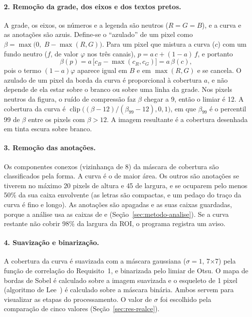 \paragraph{2. Remoção da grade, dos eixos e dos textos pretos.}
A grade, os eixos, os números e a legenda são neutros ($R=G=B$), e a curva e as anotações são azuis. Define-se o ``azulado'' de um pixel como $\beta=\max\bigl(0,\;B-\max(R,G)\bigr)$. Para um pixel que mistura a curva ($c$) com um fundo neutro ($f$, de valor $\varphi$ nos três canais), $p=a\,c+(1-a)\,f$, e portanto
\begin{equation}
\beta(p)=a\,\bigl[c_B-\max(c_R,c_G)\bigr]=a\,\beta(c),
\end{equation}
pois o termo $(1-a)\varphi$ aparece igual em $B$ e em $\max(R,G)$ e se cancela. O azulado de um pixel da borda da curva é proporcional à cobertura $a$, e não depende de ela estar sobre o branco ou sobre uma linha da grade. Nos pixels neutros da figura, o ruído de compressão faz $\beta$ chegar a 9, então o limiar é 12. A cobertura da curva é $\operatorname{clip}\bigl((\beta-12)/(\beta_{99}-12),0,1\bigr)$, em que $\beta_{99}$ é o percentil 99 de $\beta$ entre os pixels com $\beta>12$. A imagem resultante é a cobertura desenhada em tinta escura sobre branco.

\paragraph{3. Remoção das anotações.}
Os componentes conexos (vizinhança de 8) da máscara de cobertura são classificados pela forma. A curva é o de maior área. Os outros são anotações se tiverem no máximo 20 pixels de altura e 45 de largura, e se ocuparem pelo menos 50\% da sua caixa envolvente (as letras são compactas, e um pedaço do traço da curva é fino e longo). As anotações são apagadas e as suas caixas guardadas, porque a análise usa as caixas de \Sone{} e \Stwo{} (Seção~\ref{sec:metodo-analise}). Se a curva restante não cobrir 98\% da largura da ROI, o programa registra um aviso.

\paragraph{4. Suavização e binarização.}
A cobertura da curva é suavizada com a máscara gaussiana ($\sigma=1$, 7$\times$7) pela função de correlação do Requisito~1, e binarizada pelo limiar de Otsu. O mapa de bordas de Sobel é calculado sobre a imagem suavizada e o esqueleto de 1 pixel (algoritmo de Lee~\cite{lee1994}) é calculado sobre a máscara binária. Ambos servem para visualizar as etapas do processamento. O valor de $\sigma$ foi escolhido pela comparação de cinco valores (Seção~\ref{sec:res-realce}).

